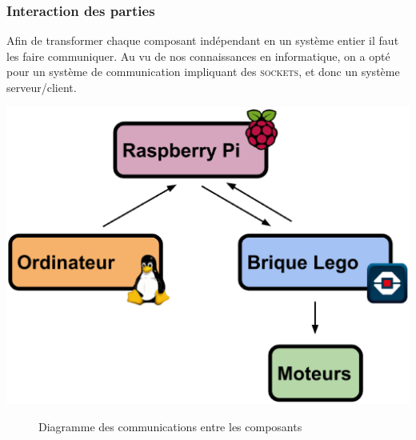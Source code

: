 \documentclass[twoside,twocolumn, 16pt]{article}
\begin{document}
\subsubsection{Interaction des parties}
Afin de transformer chaque composant indépendant en un système entier il faut les faire communiquer. Au vu de nos connaissances en informatique, on a opté pour un système de communication impliquant des \textsc{sockets}, et donc un système serveur/client.
\begin{center}
\includegraphics [scale = 0.21] {architecture.eps}
\begin{figure}[!h]
\caption{Diagramme des communications entre les composants}
\end{figure}
\end{center}	
\vspace{-1cm}
\end{document}
